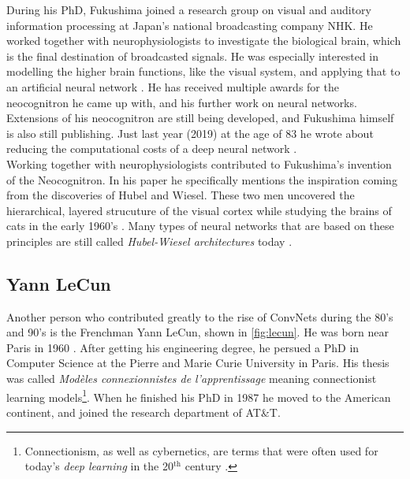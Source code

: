 During his PhD, Fukushima joined a research group on visual and auditory information processing at Japan's national broadcasting company NHK. He worked together with neurophysiologists to investigate the biological brain, which is the final destination of broadcasted signals. He was especially interested in modelling the higher brain functions, like the visual system, and applying that to an artificial neural network \cite{fuzzy}. He has received multiple awards for the neocognitron he came up with, and his further work on neural networks.  Extensions of his neocognitron are still being developed, and Fukushima himself is also still publishing. Just last year (2019) at the age of 83 he wrote about reducing the computational costs of a deep neural network \cite{83}.\\

Working together with neurophysiologists contributed to Fukushima's invention of the Neocognitron. In his paper \cite{neocog} he specifically mentions the inspiration coming from the discoveries of Hubel and Wiesel. These two men uncovered the hierarchical, layered strucuture of the visual cortex while studying the brains of cats in the early 1960's \cite{hubel, wiesel}. Many types of neural networks that are based on these principles are still called \textit{Hubel-Wiesel architectures} today \cite{convnet}.


\subsection{Yann LeCun}

Another person who contributed greatly to the rise of ConvNets during the 80's and 90's is the Frenchman Yann LeCun, shown in \autoref{fig:lecun}. He was born near Paris in 1960 \cite{bio}. After getting his engineering degree, he persued a PhD in Computer Science at the Pierre and Marie Curie University in Paris. His thesis was called \textit{Mod\`eles connexionnistes de l'apprentissage} meaning connectionist learning models\footnote{Connectionism, as well as cybernetics, are terms that were often used for today's \textit{deep learning} in the 20$^{\text{th}}$ century \cite[Ch. 1]{dl-book}.}. When he finished his PhD in 1987 he moved to the American continent, and joined the research department of AT\&T.\\

